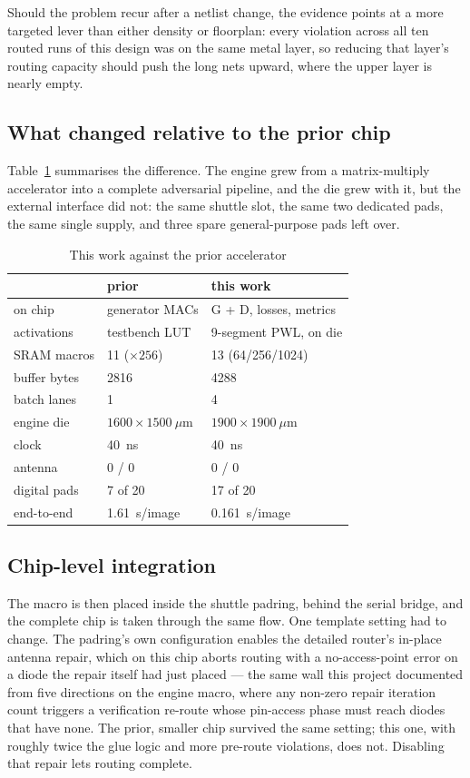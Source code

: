 \documentclass[conference,a4paper]{APSIPA2026}
\begin{document}
Should the problem recur after a netlist change, the evidence points at a more targeted lever than either density or floorplan: every violation across all ten routed runs of this design was on the same metal layer, so reducing that layer's routing capacity should push the long nets upward, where the upper layer is nearly empty.

\subsection{What changed relative to the prior chip}
Table~\ref{tab:cmp} summarises the difference. The engine grew from a matrix-multiply
accelerator into a complete adversarial pipeline, and the die grew with it, but the
external interface did not: the same shuttle slot, the same two dedicated pads, the same
single supply, and three spare general-purpose pads left over.

\begin{table}[t]
\centering
\caption{This work against the prior accelerator}
\label{tab:cmp}
\begin{tabular}{lll}
\toprule
 & prior~\cite{apic_a} & this work \\
\midrule
on chip        & generator MACs & G + D, losses, metrics \\
activations    & testbench LUT  & 9-segment PWL, on die \\
SRAM macros    & 11 ($\times256$) & 13 (64/256/1024) \\
buffer bytes   & 2816 & 4288 \\
batch lanes    & 1 & 4 \\
engine die     & $1600\times1500~\mu$m & $1900\times1900~\mu$m \\
clock          & 40~ns & 40~ns \\
antenna        & 0 / 0 & 0 / 0 \\
digital pads   & 7 of 20 & 17 of 20 \\
end-to-end     & 1.61~s/image & 0.161~s/image \\
\bottomrule
\end{tabular}
\end{table}

\subsection{Chip-level integration}\label{sec:chiplevel}
The macro is then placed inside the shuttle padring, behind the serial bridge, and the
complete chip is taken through the same flow. One template setting had to change. The
padring's own configuration enables the detailed router's in-place antenna repair, which
on this chip aborts routing with a no-access-point error on a diode the repair itself had
just placed --- the same wall this project documented from five directions on the engine
macro, where any non-zero repair iteration count triggers a verification re-route whose
pin-access phase must reach diodes that have none. The prior, smaller chip survived the
same setting; this one, with roughly twice the glue logic and more pre-route violations,
does not. Disabling that repair lets routing complete.
\end{document}
